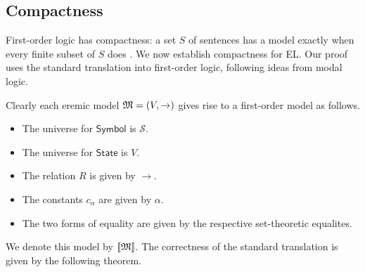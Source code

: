 \subsection{Compactness}

First-order logic has compactness: a set $S$ of sentences has a model
exactly when every finite subset of $S$ does \cite[Chapter
  4.3]{EndertonHB:matinttl}. We now establish compactness for EL. Our
proof uses the standard translation into first-order logic, following
ideas from modal logic.


\newcommand{\SEMB}[1]{\lbrack\!\lbrack #1 \rbrack\!\rbrack}
\newcommand{\STATE}{\mathsf{State}}
\newcommand{\SYMBOL}{\mathsf{Symbol}}
\newcommand{\DEFEQ}{\stackrel{\text{\emph{def}}}{=}}
\newcommand{\TRUTH}{\LOGIC{T}}
\newcommand{\TRUE}{\LOGIC{t}}
\newcommand{\LOGIC}[1]{\mathsf{#1}}
\newcommand{\CAL}[1]{\mathcal{#1}}
\newcommand{\MMM}{\frak{M}}
\newcommand{\SSS}{\CAL{S}}
\newcommand{\IMPLIES}{\supset}
\newcommand{\RED}{\rightarrow}
\newcommand{\RESTRICT}[2]{\mathsf{Restrict}_{#1}(#2)}
\newcommand{\ARROW}[2]{\mathsf{Arrow}(#1, #2)}

\NI Clearly each eremic model $\MMM = (V, \RED)$ gives rise to a
first-order model as follows.

\begin{itemize}

\item The universe for $\SYMBOL$ is $\SSS$.

\item The universe for $\STATE$ is $V$.

\item The relation $R$ is given by $\RED$.

\item The constants $c_{\alpha}$ are given by $\alpha$.

\item The two forms of equality are given by the respective
  set-theoretic equalites.

\end{itemize}

\NI We denote this model by $\SEMB{\MMM}$. The correctness of the
standard translation is given by the following theorem.

